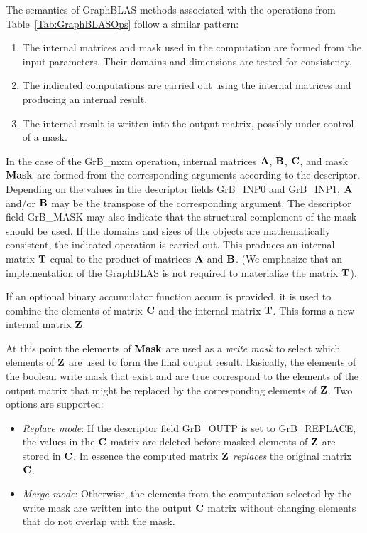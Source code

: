 The semantics of GraphBLAS methods associated with the operations from Table~\ref{Tab:GraphBLASOps} follow a similar pattern:
\begin{enumerate}
\item The internal matrices and mask used in the computation are formed from the input parameters.  Their domains and dimensions are tested for consistency.
\item The indicated computations are carried out using the internal matrices and producing an internal result.
\item The internal result is written into the output matrix, possibly under control of a mask.
\end{enumerate}
In the case of the {\sf GrB\_mxm} operation, internal matrices ${\bf A}$, ${\bf B}$, ${\bf C}$, and mask ${\bf Mask}$ are formed from
the corresponding arguments according to the descriptor.  Depending on
the values in the descriptor fields {\sf GrB\_INP0} and {\sf GrB\_INP1},  ${\bf A}$ and/or ${\bf B}$ may be the transpose of the corresponding argument.
The descriptor field {\sf GrB\_MASK} may also indicate that the structural complement of the mask 
should be used.  If the domains and sizes of the objects are mathematically consistent, the indicated operation is carried out.
This produces an internal matrix ${\bf T}$ equal to the product of matrices ${\bf A}$ and ${\bf B}$.
(We emphasize that an implementation
of the GraphBLAS is not required to materialize the matrix ${\bf T}$).

If an optional binary accumulator function {\sf accum} is provided, it is used to combine the elements of 
matrix ${\bf C}$ and the internal matrix ${\bf T}$.  This forms a new internal matrix ${\bf Z}$.   

At this point the elements of ${\bf Mask}$ are used as a \emph{write mask} to select which elements of ${\bf Z}$ are 
used to form the final output result.  Basically, the elements of the boolean write mask that exist and are true 
correspond to the elements of the output matrix that might be replaced by the corresponding elements of ${\bf Z}$.
Two options are supported: 
\begin{itemize}
	\item \emph{Replace mode}: If the descriptor field {\sf GrB\_OUTP} is set to {\sf GrB\_REPLACE}, the 
		values in the ${\bf C}$ matrix are deleted before masked elements of ${\bf Z}$ are stored 
		in ${\bf C}$.  In essence the computed matrix ${\bf Z}$ \emph{replaces} the original matrix ${\bf C}$.
	\item \emph{Merge mode}: Otherwise, the elements from the computation selected by the 
		write mask are written into the output ${\bf C}$ matrix without changing elements
		that do not overlap with the mask.
\end{itemize}

